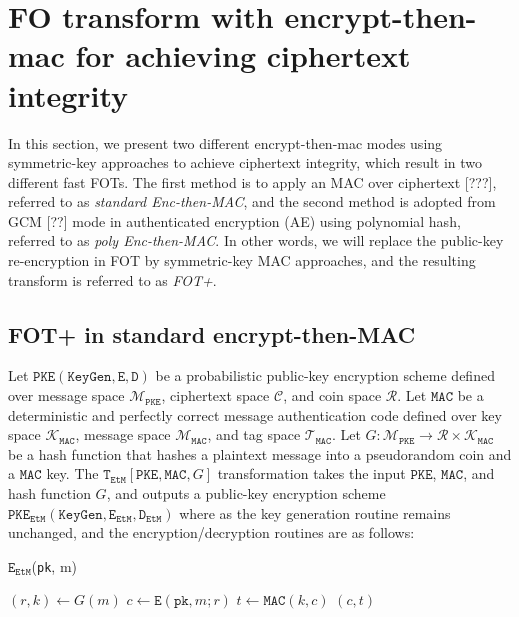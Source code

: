 \documentclass[floatrow,journal=tches,submission]{iacrtrans}
\newcommand{\monospace}{\texttt}
\newcommand{\pke}{\monospace{PKE}}
\newcommand{\keygen}{\monospace{KeyGen}}
\newcommand{\encrypt}{\monospace{E}}
\newcommand{\decrypt}{\monospace{D}}
\newcommand{\etm}{\monospace{EtM}}  %
\newcommand{\mac}{\monospace{MAC}}
\newcommand{\sign}{\monospace{MAC}}
\newcommand{\pk}{\monospace{pk}}
\begin{document}
\section{FO transform with encrypt-then-mac for achieving ciphertext integrity}\label{sec:main-results}
In this section, we present two different encrypt-then-mac modes using symmetric-key approaches   to achieve ciphertext integrity, which result in two different fast FOTs.  The first method is to apply an MAC over ciphertext [???], referred to as \emph{standard Enc-then-MAC}, and the second method is adopted from GCM [??] mode in authenticated encryption (AE) using polynomial hash, referred to as \emph{poly Enc-then-MAC}. In other words, we will replace the public-key re-encryption  in FOT  by symmetric-key MAC approaches, and the resulting transform is referred to as \emph{FOT+}. 

\subsection{FOT+ in standard encrypt-then-MAC}


Let $\pke(\keygen, \encrypt, \decrypt)$ be a probabilistic public-key encryption scheme defined over message space $\mathcal{M}_\pke$, ciphertext space $\mathcal{C}$, and coin space $\mathcal{R}$. Let $\mac$ be a deterministic and perfectly correct message authentication code defined over key space $\mathcal{K}_\mac$, message space $\mathcal{M}_\mac$, and tag space $\mathcal{T}_\mac$. Let $G: \mathcal{M}_\pke \rightarrow \mathcal{R} \times \mathcal{K}_\mac$ be a hash function that hashes a plaintext message into a pseudorandom coin and a $\mac$ key. The $\monospace{T}_\etm[\pke, \mac, G]$ transformation takes the input $\pke$, $\mac$, and hash function $G$, and outputs a public-key encryption scheme $\pke_\etm(\keygen, \encrypt_\etm, \decrypt_\etm)$ where as the key generation routine remains unchanged, and the encryption/decryption routines are as follows:

\begin{algorithm}
    \caption{$\encrypt_\etm$(\pk, m)}\label{alg:encrypt-etm}

    \begin{algorithmic}[1]
        \State $(r, k) \leftarrow G(m)$
        \State $c \leftarrow \encrypt(\pk, m; r)$
        \State $t \leftarrow \sign(k, c)$
        \State \Return $(c, t)$
    \end{algorithmic}
\end{algorithm}
\end{document}
